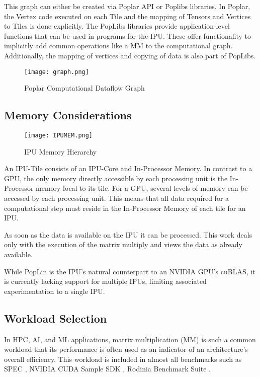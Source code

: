 \documentclass[a4paper,UKenglish,cleveref, autoref, thm-restate]{oasics-v2021}
\begin{document}
This graph can either be created via Poplar API or Poplibs libraries. In Poplar, the Vertex code executed on each Tile and the mapping of Tensors and Vertices to Tiles is done explicitly. 
The PopLibs libraries provide application-level functions that can be used in programs for the IPU. These offer functionality to implicitly add common operations like a MM to the computational graph. Additionally, the mapping of vertices and copying of data is also part of PopLibs.

\begin{figure}[htbp]
	\centerline{\texttt{[image: graph.png]}}
	\caption{Poplar Computational Dataflow Graph \cite{b8}}
	\label{fig: graph}
\end{figure}

\subsection{Memory Considerations}
\begin{figure}[htbp]
	\centerline{\texttt{[image: IPUMEM.png]}}
	\caption{IPU Memory Hierarchy \cite{RemoteBuffer}}
	\label{fig: memory_hierarchy}
\end{figure}

An IPU-Tile consists of an IPU-Core and In-Processor Memory.
In contrast to a GPU, the only memory directly accessible by each processing unit is the In-Processor memory local to its tile. For a GPU, several levels of memory can be accessed by each processing unit. This means that all data required for a computational step  must reside in the In-Processor Memory of each tile for an IPU.

As soon as the data is available on the IPU it can be processed. This work deals only with the execution of the matrix multiply and views the data as already available. 

While PopLin is the IPU's natural counterpart to an NVIDIA GPU's cuBLAS, it is currently lacking support for multiple IPUs, limiting associated experimentation to a single IPU.


\subsection{Workload Selection}

In HPC, AI, and ML applications, matrix multiplication (MM) is such a common workload that its performance is often used as an indicator of an architecture's overall efficiency. This workload is included in almost all benchmarks such as SPEC \cite{SPEC}, NVIDIA CUDA Sample SDK \cite{NVIDIAcuda}, Rodinia Benchmark Suite \cite{Rodinia}.
\end{document}
